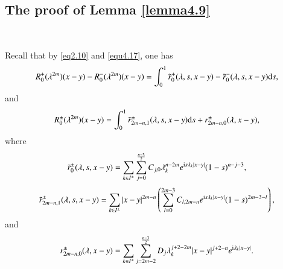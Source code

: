 \documentclass[11pt,reqno]{amsart}
\def\d{{\rm d}}
\def\i{{\rm i}}
\numberwithin{equation}{section}
\theoremstyle{definition}
\begin{document}
\begin{appendix}
	\subsection{The proof of Lemma \ref{lemma4.9}}\
	
	Recall that by \eqref{eq2.10} and  \eqref{equ4.17}, one has
	\begin{align}\label{equ.4.2.r0}
		R_{0}^{+}(\lambda^{2m})(x-y)-R_{0}^{-}(\lambda^{2m})(x-y)=\int_0^1{\tilde{r}^{+}_0(\lambda, s, x-y)-\tilde{r}^{-}_0(\lambda, s, x-y)\d s},
	\end{align}
	and
	\begin{equation}\label{equ.4.2.r1}
		R_{0}^{\pm}(\lambda^{2m})(x-y)=\int_0^1{ \tilde{r}^{\pm}_{2m-n, 1}(\lambda, s, x-y)\d s}+ r^{\pm}_{2m-n, 0}(\lambda,  x-y),
	\end{equation}
	where  
	\begin{equation*}
		\tilde{r}^{\pm}_0(\lambda, s, x-y)=\sum_{k\in I^{\pm}} \sum_{j=0}^{\frac{n-3}{2}} C_{j,0} \lambda_{k}^{n-2 m} e^{\i s \lambda_{k}|x-y|}(1-s)^{n-j-3},
	\end{equation*}
	\begin{equation*}
		\tilde{r}^{\pm}_{2m-n, 1}(\lambda, s, x-y)=\sum_{k\in I^{\pm}}|x-y|^{2m-n} \left(\sum_{l=0}^{2m-3} C_{l,2m-n} e^{\i s \lambda_{k}|x-y|}(1-s)^{2m-3-l}\right),
	\end{equation*}
	and
	\begin{equation*}
		r^{\pm}_{2m-n, 0}(\lambda,  x-y)=\sum\limits_{k\in I^{\pm}}\sum\limits_{j=2m-2}^{\frac{n-3}{2}}D_{j}\lambda_k^{j+2-2m}|x-y|^{j+2-n}e^{\i\lambda_{k}|x-y|}.
	\end{equation*}
	

\end{appendix}
\end{document}
